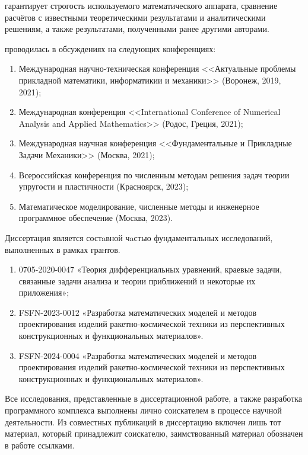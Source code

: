 {\reliability} гарантирует строгость используемого математического аппарата, сравнение расчётов с известными теоретическими результатами и аналитическими решениям, а также результатами, полученными ранее другими авторами.


{\probation}
проводилась в обсуждениях на следующих конференциях:
\begin{enumerate}
	\item Международная научно-техническая конференция <<Актуальные проблемы прикладной математики, информатикии и механики>> (Воронеж, 2019, 2021);
	\item Международная конференция <<International Conference of Numerical Analysis and Applied Mathematics>> (Родос, Греция, 2021);
	\item Международная научная конференция <<Фундаментальные и Прикладные Задачи Механики>> (Москва, 2021);
	\item Всероссийская конференция по численным методам решения задач теории упругости и пластичности (Красноярск, 2023);
	\item Математическое моделирование, численные методы и инженерное программное обеспечение (Москва, 2023).
\end{enumerate}

Диссертация является состaвной чaстью фундаментальных исследований, выполненных в рамках грантов.
\begin{enumerate}
	\item 0705-2020-0047 «Теория дифференциальных уравнений, краевые задачи, связанные задачи анализа и теории приближений и некоторые их приложения»;
	\item FSFN-2023-0012 «Разработка математических моделей и методов проектирования изделий ракетно-космической техники из перспективных конструкционных и функциональных материалов».
	\item FSFN-2024-0004 «Разработка математических моделей и методов проектирования изделий ракетно-космической техники из перспективных конструкционных и функциональных материалов».
\end{enumerate}

{\contribution}
Все исследования, представленные в диссертационной работе, а также разработка программного комплекса выполнены лично соискателем в процессе научной деятельности. Из совместных публикаций в диссертацию включен лишь тот материал, который принадлежит соискателю, заимствованный материал обозначен в работе ссылками.


